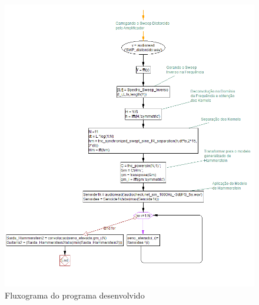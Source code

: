 \begin{figure}[!htb]

	\includegraphics[width=1.0\linewidth]{figuras/Diagrama_Matlab}
	\caption{Fluxograma do programa desenvolvido}
	\label{fig:diagramamatlab}
\end{figure}
